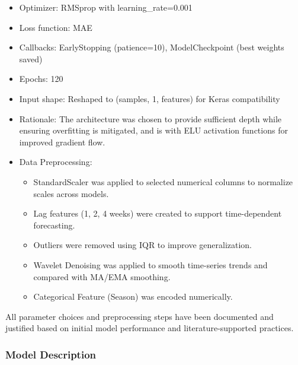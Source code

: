 \begin{itemize}
\begin{itemize}
    \item Optimizer: RMSprop with learning\_rate=0.001
    \item Loss function: MAE
    \item Callbacks: EarlyStopping (patience=10), ModelCheckpoint (best weights saved)
    \item Epochs: 120
    \item Input shape: Reshaped to (samples, 1, features) for Keras compatibility
    \item Rationale: The architecture was chosen to provide sufficient depth while ensuring overfitting is mitigated, and is with ELU activation functions for improved gradient flow.
    \item Data Preprocessing:
    \begin{itemize}
      \item StandardScaler was applied to selected numerical columns to normalize scales across models.
      \item Lag features (1, 2, 4 weeks) were created to support time-dependent forecasting.
      \item Outliers were removed using IQR to improve generalization.
      \item Wavelet Denoising was applied to smooth time-series trends and compared with MA/EMA smoothing.
      \item Categorical Feature (Season) was encoded numerically.
    \end{itemize}
  \end{itemize}
\end{itemize}

All parameter choices and preprocessing steps have been documented and justified based on initial model performance and literature-supported practices.

\subsubsection*{Model Description}

